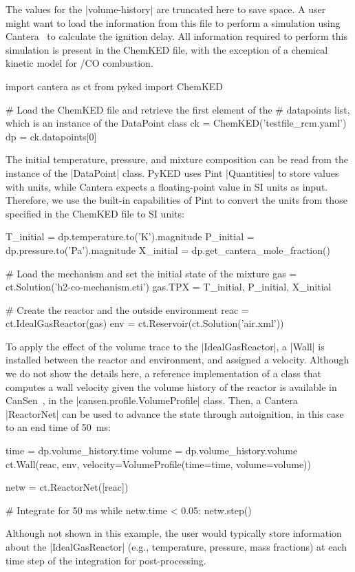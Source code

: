 \documentclass[12pt]{ijck}
\newcommand\ck{ChemKED}
\newcommand\pk{PyKED}
\begin{document}
%
The values for the \yabox|volume-history| are truncated here to save space. A user
might want to load the information from this file to perform a simulation using
Cantera~\autocite{Cantera:2.3.0} to calculate the ignition delay. All information
required to perform this simulation is present in the \ck{} file, with the exception
of a chemical kinetic model for \slash {CO} combustion.
%
\begin{pythonbox}
import cantera as ct
from pyked import ChemKED

# Load the ChemKED file and retrieve the first element of the
# datapoints list, which is an instance of the DataPoint class
ck = ChemKED('testfile_rcm.yaml')
dp = ck.datapoints[0]
\end{pythonbox}
%
The initial temperature, pressure, and mixture composition can be read from the
instance of the \pybox|DataPoint| class. \pk{} uses Pint \pybox|Quantities| to
store values with units, while Cantera expects a floating-point value in SI
units as input. Therefore, we use the built-in capabilities of Pint to convert
the units from those specified in the \ck{} file to SI units:
%
\begin{pythonbox}
T_initial = dp.temperature.to('K').magnitude
P_initial = dp.pressure.to('Pa').magnitude
X_initial = dp.get_cantera_mole_fraction()

# Load the mechanism and set the initial state of the mixture
gas = ct.Solution('h2-co-mechanism.cti')
gas.TPX = T_initial, P_initial, X_initial

# Create the reactor and the outside environment
reac = ct.IdealGasReactor(gas)
env = ct.Reservoir(ct.Solution('air.xml'))
\end{pythonbox}
%
To apply the effect of the volume trace to the \pybox|IdealGasReactor|, a
\pybox|Wall| is installed between the reactor and environment, and assigned
a velocity. Although we do not show the details here, a reference implementation
of a class that computes a wall velocity given the volume history of the reactor
is available in CanSen~\autocite{cansen}, in the
\pybox|cansen.profile.VolumeProfile| class. Then, a Cantera \pybox|ReactorNet|
can be used to advance the state through autoignition, in this case to an end
time of \SI{50}{\milli\second}:
%
\begin{pythonbox}
time = dp.volume_history.time
volume = dp.volume_history.volume
ct.Wall(reac, env, velocity=VolumeProfile(time=time, volume=volume))

netw = ct.ReactorNet([reac])

# Integrate for 50 ms
while netw.time < 0.05:
    netw.step()
\end{pythonbox}
%
Although not shown in this example, the user would typically store information
about the \pybox|IdealGasReactor| (e.g., temperature, pressure, mass fractions)
at each time step of the integration for post-processing.
\end{document}
